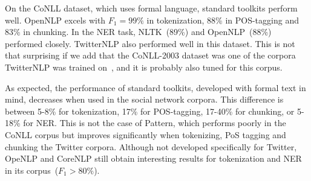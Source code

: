\begin{table}[H]
\centering
{}
\caption[NEC Performance Results]{NEC Performance Results}
\label{tab:performance_nec}
\end{table}

On the CoNLL dataset, which uses formal language, standard toolkits perform well. OpenNLP excels with $F_1=99\%$ in tokenization, 88\% in POS-tagging and 83\% in chunking. 
In the NER task, NLTK~(89\%) and OpenNLP~(88\%) performed closely. 
TwitterNLP also performed well in this dataset. This is not that surprising if we add that the CoNLL-2003 dataset was one of the corpora TwitterNLP was trained on~\cite{Ritter2011TwitterNLP}, and it is probably also tuned for this corpus.

As expected, the performance of standard toolkits, developed with formal text in mind, decreases when used in the social network corpora. This difference is between 5-8\% for tokenization, 17\% for POS-tagging, 17-40\% for chunking, or 5-18\% for NER. This is not the case of Pattern, which performs poorly in the CoNLL corpus but improves significantly when tokenizing, PoS tagging and chunking the Twitter corpora.
Although not developed specifically for Twitter, OpeNLP and CoreNLP still obtain interesting results for tokenization and NER in its corpus~($F_1 > 80\%$).

